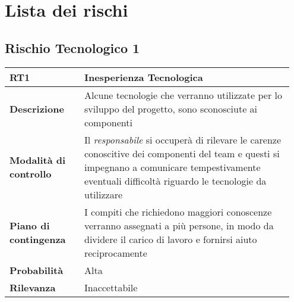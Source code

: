 \section{Lista dei rischi}\label{section:lista_rischi}

\subsection{Rischio Tecnologico 1}

\begin{table}[H]
    \bgroup
    \def\arraystretch{1.5}
    \begin{tabular} {
            | p{0.25\linewidth} | p{0.70\linewidth} |
        }
        \hline
        \textbf{RT1}                   & \textbf{Inesperienza Tecnologica}                                                                                                                                                                            \\
        \hline
        \textbf{Descrizione}           & Alcune tecnologie che verranno utilizzate per lo sviluppo del progetto, sono sconosciute ai componenti                                                                                                       \\
        \hline
        \textbf{Modalità di controllo} & Il \textit{responsabile} si occuperà di rilevare le carenze conoscitive dei componenti del team e questi si impegnano a comunicare tempestivamente eventuali difficoltà riguardo le tecnologie da utilizzare \\
        \hline
        \textbf{Piano di contingenza}  & I compiti che richiedono maggiori conoscenze verranno assegnati a più persone, in modo da dividere il carico di lavoro e fornirsi aiuto reciprocamente                                                       \\
        \hline
        \textbf{Probabilità}           & Alta                                                                                                                                                                                                         \\
        \hline
        \textbf{Rilevanza}             & Inaccettabile                                                                                                                                                                                                \\
        \hline
    \end{tabular}
    \egroup
\end{table}

